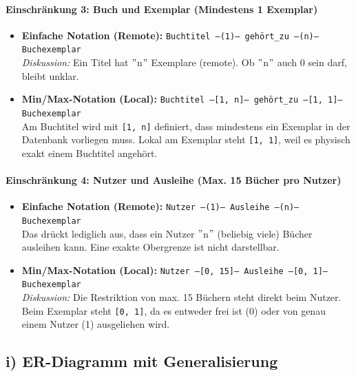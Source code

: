 \documentclass[12pt]{scrartcl}
\begin{document}
    \paragraph*{Einschränkung 3: Buch und Exemplar (Mindestens 1 Exemplar)}
    \begin{itemize}
        \item \textbf{Einfache Notation (Remote):} \texttt{Buchtitel ---(1)--- gehört\_zu ---(n)--- Buchexemplar} \\
        \textit{Diskussion:} Ein Titel hat \("\)n\("\) Exemplare (remote). Ob \("\)n\("\) auch 0 sein darf, bleibt unklar.
        \item \textbf{Min/Max-Notation (Local):} \texttt{Buchtitel ---[1, n]--- gehört\_zu ---[1, 1]--- Buchexemplar} \\
        Am Buchtitel wird mit \texttt{[1, n]} definiert, dass mindestens ein Exemplar in der Datenbank vorliegen muss. Lokal am Exemplar steht \texttt{[1, 1]}, weil es physisch exakt einem Buchtitel angehört.
    \end{itemize}

    \paragraph*{Einschränkung 4: Nutzer und Ausleihe (Max. 15 Bücher pro Nutzer)}
    \begin{itemize}
        \item \textbf{Einfache Notation (Remote):} \texttt{Nutzer ---(1)--- Ausleihe ---(n)--- Buchexemplar} \\
        Das drückt lediglich aus, dass ein Nutzer \("\)n\("\) (beliebig viele) Bücher ausleihen kann. Eine exakte Obergrenze ist nicht darstellbar.
        \item \textbf{Min/Max-Notation (Local):} \texttt{Nutzer ---[0, 15]--- Ausleihe ---[0, 1]--- Buchexemplar} \\
        \textit{Diskussion:} Die Restriktion von max. 15 Büchern steht direkt beim Nutzer. Beim Exemplar steht \texttt{[0, 1]}, da es entweder frei ist (0) oder von genau einem Nutzer (1) ausgeliehen wird.
    \end{itemize}


    \subsection*{i) ER-Diagramm mit Generalisierung}

\end{document}
